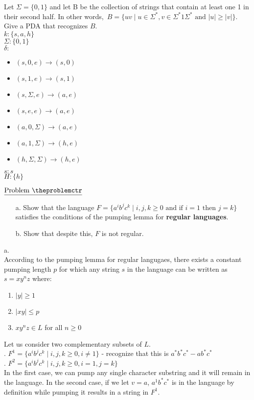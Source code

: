 \documentclass[11pt]{article}
\def\pp{\par\noindent}
\begin{document}
\noindent Let $\Sigma=\{0,1\}$ and let B be the collection of strings that contain at least one 1 in their second half. In other words,\
$B=\{uv \mid u\in\Sigma^*, v\in\Sigma^ *1\Sigma^* \mbox{ and } |u|\geq|v|\}$.
Give a PDA that recognizes $B$.\\
$k: \{s,a,h\}$\\
$\Sigma: \{0,1\}$\\
$\delta:$
\begin{itemize}
    \item $(s,0,e)\rightarrow(s,0)$
    \item $(s,1,e)\rightarrow(s,1)$
    \item $(s,\Sigma,e)\rightarrow(a,e)$
    \item $(s,e,e)\rightarrow(a,e)$
    \item $(a,0,\Sigma)\rightarrow(a,e)$
    \item $(a,1,\Sigma)\rightarrow(h,e)$
    \item $(h,\Sigma,\Sigma)\rightarrow(h,e)$
\end{itemize}
$s:s$\\
$H:\{h\}$
\bigskip
\bigskip
\addtocounter{problemctr}{1}

\noindent $\underline{\rm Problem\ \theproblemctr}$\pp
\begin{enumerate}
	\item[a.]
	Show that the language $F=\{a^i b^j c^k \mid i,j,k \geqslant 0 \mbox{ and if } i=1 \mbox{ then } j=k\}$ satisfies the conditions of the pumping lemma for {\bf regular languages}.
	\item[b.]
	Show that despite this, $F$ is not regular.\\
\end{enumerate}

\noindent
a.\\
According to the pumping lemma for regular langugaes, there exists a constant pumping length $p$ for which any string $s$ in the language can be written as $s=xy^nz$ where:
\indent
\begin{enumerate}
    \item $|y|\geq 1$
    \item $|xy|\leq p$
    \item $xy^nz \in L$ for all $n\geq0$\\
\end{enumerate}

\noindent
Let us consider two complementary subsets of $L$.\\
. $F^1=\{a^i b^j c^k \mid i,j,k\geq0, i\neq1\}$ - recognize that this is $a^*b^*c^*-ab^*c^*$\\
\indent 2. $F^2=\{a^i b^j c^k \mid i,j,k\geq0, i=1, j=k\}$\\
In the first case, we can pump any single character substring and it will remain in the language.
In the second case, if we let $v=a$, $a^1b^*c^*$ is in the language by definition while pumping it results in a string in $F^1$.\\
\end{document}
